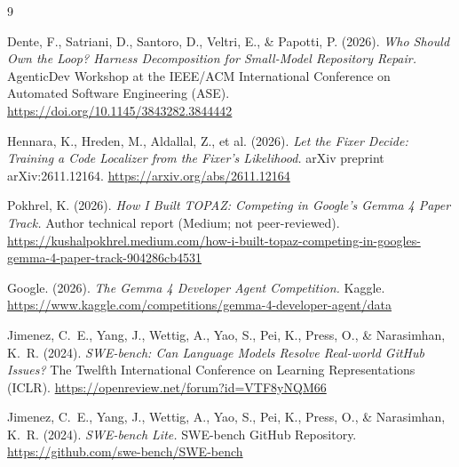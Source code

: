 \documentclass[11pt,a4paper]{article}
\begin{document}
\begin{thebibliography}{9}

Dente, F., Satriani, D., Santoro, D., Veltri, E., \& Papotti, P. (2026).
\emph{Who Should Own the Loop? Harness Decomposition for Small-Model Repository Repair.}
AgenticDev Workshop at the IEEE/ACM International Conference on Automated Software Engineering (ASE).
\url{https://doi.org/10.1145/3843282.3844442}

Hennara, K., Hreden, M., Aldallal, Z., et al. (2026).
\emph{Let the Fixer Decide: Training a Code Localizer from the Fixer's Likelihood.}
arXiv preprint arXiv:2611.12164.
\url{https://arxiv.org/abs/2611.12164}

Pokhrel, K. (2026).
\emph{How I Built TOPAZ: Competing in Google's Gemma 4 Paper Track.}
Author technical report (Medium; not peer-reviewed).
\url{https://kushalpokhrel.medium.com/how-i-built-topaz-competing-in-googles-gemma-4-paper-track-904286cb4531}

Google. (2026).
\emph{The Gemma 4 Developer Agent Competition.} Kaggle.
\url{https://www.kaggle.com/competitions/gemma-4-developer-agent/data}

Jimenez, C.\ E., Yang, J., Wettig, A., Yao, S., Pei, K., Press, O., \& Narasimhan, K.\ R. (2024).
\emph{SWE-bench: Can Language Models Resolve Real-world GitHub Issues?}
The Twelfth International Conference on Learning Representations (ICLR).
\url{https://openreview.net/forum?id=VTF8yNQM66}

Jimenez, C.\ E., Yang, J., Wettig, A., Yao, S., Pei, K., Press, O., \& Narasimhan, K.\ R. (2024).
\emph{SWE-bench Lite.} SWE-bench GitHub Repository.
\url{https://github.com/swe-bench/SWE-bench}

\end{thebibliography}
\end{document}
